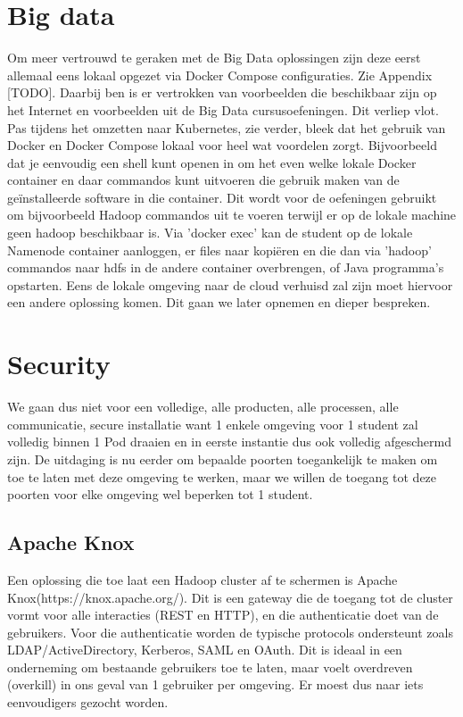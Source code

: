 \section{Big data}

Om meer vertrouwd te geraken met de Big Data oplossingen zijn deze eerst allemaal eens lokaal opgezet via Docker Compose configuraties. Zie Appendix [TODO].
Daarbij ben is er vertrokken van voorbeelden die beschikbaar zijn op het Internet en voorbeelden uit de Big Data cursusoefeningen.
\newline
\newline
Dit verliep vlot. Pas tijdens het omzetten naar Kubernetes, zie verder, bleek dat het gebruik van Docker en Docker Compose lokaal voor heel wat voordelen zorgt. Bijvoorbeeld dat je eenvoudig een shell kunt openen in om het even welke lokale Docker container en daar commandos kunt uitvoeren die gebruik maken van de geïnstalleerde software in die container. Dit wordt voor de oefeningen gebruikt om bijvoorbeeld Hadoop commandos uit te voeren terwijl er op de lokale machine geen hadoop beschikbaar is. Via 'docker exec' kan de student op de lokale Namenode container aanloggen, er files naar kopiëren en die dan via 'hadoop' commandos naar hdfs in de andere container overbrengen, of Java programma's opstarten.
Eens de lokale omgeving naar de cloud verhuisd zal zijn moet hiervoor een andere oplossing komen. Dit gaan we later opnemen en dieper bespreken.

\section{Security}
We gaan dus niet voor een volledige, alle producten, alle processen, alle communicatie, secure installatie want 1 enkele omgeving voor 1 student zal volledig binnen 1 Pod draaien en in eerste instantie dus ook volledig afgeschermd zijn.
De uitdaging is nu eerder om bepaalde poorten toegankelijk te maken om toe te laten met deze omgeving te werken, maar we willen de toegang tot deze poorten voor elke omgeving wel beperken tot 1 student.

\subsection{Apache Knox}
Een oplossing die toe laat een Hadoop cluster af te schermen is Apache Knox\newline (https://knox.apache.org/). Dit is een gateway die de toegang tot de cluster vormt voor alle interacties (REST en HTTP), en die authenticatie doet van de gebruikers. Voor die authenticatie worden de typische protocols ondersteunt zoals LDAP/ActiveDirectory, Kerberos, SAML en OAuth. Dit is ideaal in een onderneming om bestaande gebruikers toe te laten, maar voelt overdreven (overkill) in ons geval van 1 gebruiker per omgeving. Er moest dus naar iets eenvoudigers gezocht worden.

